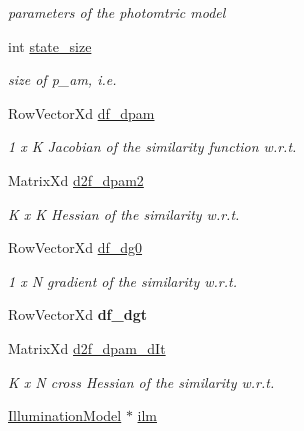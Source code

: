 \begin{DoxyCompactItemize}
\begin{DoxyCompactList}\small\item\em parameters of the photomtric model \end{DoxyCompactList}\item 
int \hyperlink{classAppearanceModel_a5937ea8489c951e023b5c0b171646107}{state\-\_\-size}
\begin{DoxyCompactList}\small\item\em size of p\-\_\-am, i.\-e. \end{DoxyCompactList}\item 
Row\-Vector\-Xd \hyperlink{classAppearanceModel_a417bdfbe1bed69bbb76feafdc335a4f3}{df\-\_\-dpam}
\begin{DoxyCompactList}\small\item\em 1 x K Jacobian of the similarity function w.\-r.\-t. \end{DoxyCompactList}\item 
Matrix\-Xd \hyperlink{classAppearanceModel_adf79d9809d4ba3fec3d8ac84fc80fe59}{d2f\-\_\-dpam2}
\begin{DoxyCompactList}\small\item\em K x K Hessian of the similarity w.\-r.\-t. \end{DoxyCompactList}\item 
Row\-Vector\-Xd \hyperlink{classAppearanceModel_a155e9a776cfb1460c569e34ae05a3774}{df\-\_\-dg0}
\begin{DoxyCompactList}\small\item\em 1 x N gradient of the similarity w.\-r.\-t. \end{DoxyCompactList}\item 
\hypertarget{classAppearanceModel_ae734d9511acd8dd6da0d1106769a9a3d}{Row\-Vector\-Xd {\bfseries df\-\_\-dgt}}\label{classAppearanceModel_ae734d9511acd8dd6da0d1106769a9a3d}

\item 
Matrix\-Xd \hyperlink{classAppearanceModel_a05e7fd0e06e95cc1b3baeca2f5b061c7}{d2f\-\_\-dpam\-\_\-d\-It}
\begin{DoxyCompactList}\small\item\em K x N cross Hessian of the similarity w.\-r.\-t. \end{DoxyCompactList}\item 
\hypertarget{classAppearanceModel_a27b73a098c9bef0e53dfe5c7c76fcedb}{\hyperlink{classIlluminationModel}{Illumination\-Model} $\ast$ \hyperlink{classAppearanceModel_a27b73a098c9bef0e53dfe5c7c76fcedb}{ilm}}\label{classAppearanceModel_a27b73a098c9bef0e53dfe5c7c76fcedb}


\end{DoxyCompactItemize}
